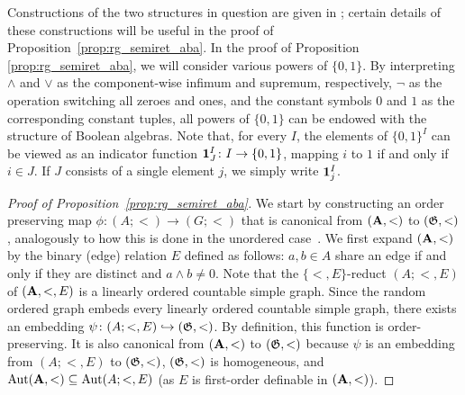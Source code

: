  Constructions of the two structures in question are given in \cite{kechris2005fraisse}; certain details of these constructions will be useful in the proof of Proposition~\ref{prop:rg_semiret_aba}.
%
In the proof of Proposition \ref{prop:rg_semiret_aba}, we will consider various powers of $\{0,1\}$. By interpreting $\wedge$ and $\vee$ as the component-wise infimum and supremum, respectively, $\neg$ as the operation switching all zeroes and ones, and the constant symbols $0$ and $1$ as the corresponding constant tuples, all powers of $\{0,1\}$ can be endowed with the structure of Boolean algebras. 
%
Note that, for every $I$, the elements of $\{0,1\}^I$ can be viewed as an indicator function $\mathbf{1}_{J}^{I}\colon I \rightarrow \{0,1\}$, mapping $i$ to $1$ if and only if $i\in J$.
%
If $J$ consists of a single element $j$, we simply write $\mathbf{1}_{j}^{I}$.
\begin{proof}[Proof of Proposition~\ref{prop:rg_semiret_aba}]
    We start by constructing an order preserving map $\phi\colon  (A;<) \rightarrow (G;<) $ that is canonical from $(\mathbf{A},<)$ to $(\mathfrak{G},<)$, analogously to how this is done in the unordered case~\cite{BARTOŠOVÁ_SCOW_2024}.
    We first expand $(\mathbf{A},<)$ by the binary (edge) relation $E$ defined as follows:
    $a,b\in A$ share an edge if and only if they are distinct and $a \wedge b \neq 0$.
    Note that the $\{<,E\}$-reduct $(A;<,E)$ of $(\mathbf{A},<,E)$ is a linearly ordered countable simple graph.
    Since the random ordered graph embeds every linearly ordered countable simple graph, there exists an embedding $\psi\colon (A;<,E) \hookrightarrow (\mathfrak{G},<)$.
    By definition, this function is order-preserving.
    It is also canonical from $(\mathbf{A},<)$ to $(\mathfrak{G},<)$ because $\psi$ is an embedding from $(A;<,E)$ to $(\mathfrak{G},<)$, $(\mathfrak{G},<)$ is homogeneous, and $\mathrm{Aut}(\mathbf{A},<) \subseteq \mathrm{Aut}(A;<,E) $ (as $E$ is first-order definable in $(\mathbf{A},<)$).
    

\end{proof}
